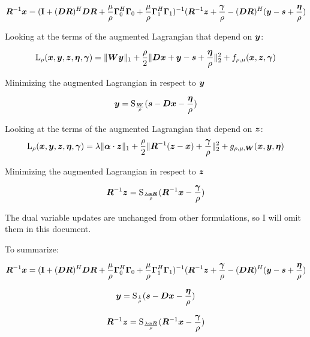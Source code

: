 \documentclass{article}
\begin{document}
\begin{equation}
\bm{R}^{-1}\bm{x} = ({\bf I} + (\bm{D}\bm{R})^H\bm{D}\bm{R} + \frac{\mu}{\rho}\bm{\Gamma}_0^H\bm{\Gamma}_0 + \frac{\mu}{\rho}\bm{\Gamma}_1^H\bm{\Gamma}_1)^{-1}(\bm{R}^{-1}\bm{z} + \frac{\bm{\gamma}}{\rho} - (\bm{D}\bm{R})^H(\bm{y} - \bm{s} + \frac{\bm{\eta}}{\rho})
\end{equation}

Looking at the terms of the augmented Lagrangian that depend on $\bm{y}$:

\begin{equation}
\operatorname{L}_{\rho}(\bm{x},\bm{y},\bm{z},\bm{\eta},\bm{\gamma}) = \|\bm{W}\bm{y}\|_1 + \frac{\rho}{2}\|\bm{D}\bm{x} + \bm{y} - \bm{s} + \frac{\bm{\eta}}{\rho}\|_2^2 + f_{\rho,\mu}(\bm{x},\bm{z},\bm{\gamma})
\end{equation}

Minimizing the augmented Lagrangian in respect to $\bm{y}$

\begin{equation}
\bm{y} = \operatorname{S}_{\frac{\bm{W}}{\rho}}(\bm{s} - \bm{D}\bm{x} - \frac{\bm{\eta}}{\rho})
\end{equation}

Looking at the terms of the augmented Lagrangian that depend on $\bm{z}$:
\begin{equation}
\operatorname{L}_{\rho}(\bm{x},\bm{y},\bm{z},\bm{\eta},\bm{\gamma}) = \lambda\|\bm{\alpha} \cdot \bm{z}\|_1 + \frac{\rho}{2}\|\bm{R}^{-1}(\bm{z} - \bm{x}) + \frac{\bm{\gamma}}{\rho}\|_2^2 + g_{\rho,\mu,\bm{W}}(\bm{x},\bm{y},\bm{\eta})
\end{equation}

Minimizing the augmented Lagrangian in respect to $\bm{z}$

\begin{equation}
\bm{R}^{-1}\bm{z} = \operatorname{S}_{\frac{\lambda\bm{\alpha}\bm{R}}{\rho}}(\bm{R}^{-1}\bm{x} - \frac{\bm{\gamma}}{\rho})
\end{equation}

The dual variable updates are unchanged from other formulations, so I will omit them in this document.


To summarize:

\begin{equation}
\bm{R}^{-1}\bm{x} = ({\bf I} + (\bm{D}\bm{R})^H\bm{D}\bm{R} + \frac{\mu}{\rho}\bm{\Gamma}_0^H\bm{\Gamma}_0 + \frac{\mu}{\rho}\bm{\Gamma}_1^H\bm{\Gamma}_1)^{-1}(\bm{R}^{-1}\bm{z} + \frac{\bm{\gamma}}{\rho} - (\bm{D}\bm{R})^H(\bm{y} - \bm{s} + \frac{\bm{\eta}}{\rho})
\end{equation}

\begin{equation}
\bm{y} = \operatorname{S}_{\frac{1}{\rho}}(\bm{s} - \bm{D}\bm{x} - \frac{\bm{\eta}}{\rho})
\end{equation}

\begin{equation}
\bm{R}^{-1}\bm{z} = \operatorname{S}_{\frac{\lambda\bm{\alpha}\bm{R}}{\rho}}(\bm{R}^{-1}\bm{x} - \frac{\bm{\gamma}}{\rho})
\end{equation}
\end{document}
